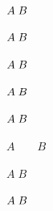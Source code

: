 $A\hskip0.27778em B$

$A\hspace*{0.27778em}B$

$A\kern0.27778em B$

$A\mkern5mu B$

$A\mskip5mu B$

$A\quad\quad B$

$A\;B$

$A\hspace{0.27778em}B$
